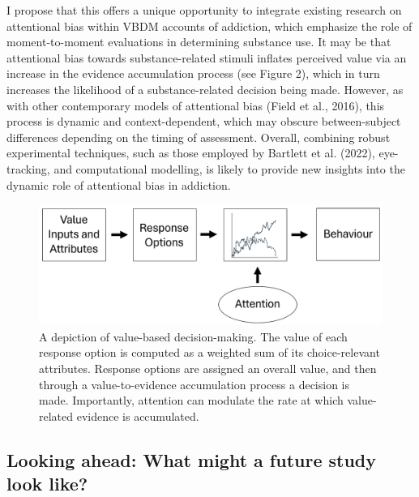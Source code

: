 \documentclass[authordate, empirical]{jote-new-article}
\begin{document}
	I propose that this offers a unique opportunity to integrate existing research on attentional bias within VBDM accounts of addiction, which emphasize the role of moment-to-moment evaluations in determining substance use. It may be that attentional bias towards substance-related stimuli inflates perceived value via an increase in the evidence accumulation process (see Figure 2), which in turn increases the likelihood of a substance-related decision being made. However, as with other contemporary models of attentional bias (Field et al., 2016), this process is dynamic and context-dependent, which may obscure between-subject differences depending on the timing of assessment. Overall, combining robust experimental techniques, such as those employed by Bartlett et al. (2022), eye-tracking, and computational modelling, is likely to provide new insights into the dynamic role of attentional bias in addiction.



	\begin{figure}
		\includegraphics[width=\linewidth]{media/image2.png}

		\caption{A depiction of value-based decision-making. The value of each response option is computed as a weighted sum of its choice-relevant attributes. Response options are assigned an overall value, and then through a value-to-evidence accumulation process a decision is made. Importantly, attention can modulate the rate at which value-related evidence is accumulated.}

		\label{fig:rId13}


	\end{figure}



	\subsection{Looking ahead: What might a future study look like?}
\end{document}
